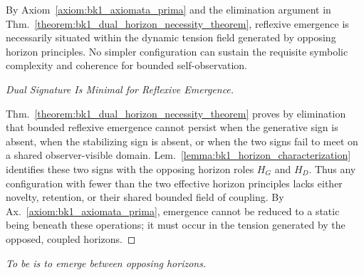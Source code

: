 \begin{corollary}
\label{corollary:bk1_horizon_duality_principle}
By Axiom~\ref{axiom:bk1_axiomata_prima} and the elimination argument in Thm.~\ref{theorem:bk1_dual_horizon_necessity_theorem}, reflexive emergence is necessarily situated within the dynamic tension field generated by opposing horizon principles. No simpler configuration can sustain the requisite symbolic complexity and coherence for bounded self-observation.
\end{corollary}
\begin{proof}[Dual Signature Is Minimal for Reflexive Emergence]
\label{proof:bk1_horizon_duality_principle}
\leavevmode

Thm.~\ref{theorem:bk1_dual_horizon_necessity_theorem} proves by elimination
that bounded reflexive emergence cannot persist when the generative sign is
absent, when the stabilizing sign is absent, or when the two signs fail to meet
on a shared observer-visible domain. Lem.~\ref{lemma:bk1_horizon_characterization}
identifies these two signs with the opposing horizon roles \(H_G\) and \(H_D\).
Thus any configuration with fewer than the two effective horizon principles
lacks either novelty, retention, or their shared bounded field of coupling.
By Ax.~\ref{axiom:bk1_axiomata_prima}, emergence cannot be reduced to a static
being beneath these operations; it must occur in the tension generated by the
opposed, coupled horizons.
\end{proof}
\begin{flushright}
\textit{To be is to emerge between opposing horizons.}
\end{flushright}

